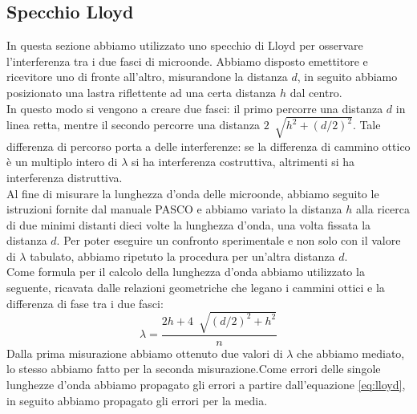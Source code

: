 \documentclass[letterpaper,12pt]{article}
\begin{document}
\subsection{Specchio Lloyd}
In questa sezione abbiamo utilizzato uno specchio di Lloyd per osservare l'interferenza tra i due fasci di microonde. 
Abbiamo disposto emettitore e ricevitore uno di fronte all'altro, misurandone la distanza $d$, in seguito abbiamo 
posizionato una lastra riflettente ad una certa distanza $h$ dal centro. \\
In questo modo si vengono a creare due fasci: il primo percorre una distanza $d$ in linea retta, mentre il secondo
percorre una distanza $2\ \sqrt[]{h^2 + (d/2)^2}$. Tale differenza di percorso porta a delle interferenze: 
se la differenza di cammino ottico è un multiplo intero di $\lambda$ si ha interferenza costruttiva, 
altrimenti si ha interferenza distruttiva.\\
Al fine di misurare la lunghezza d'onda delle microonde, abbiamo seguito le istruzioni fornite dal manuale 
PASCO e abbiamo variato la distanza $h$ alla ricerca di due minimi distanti dieci volte la lunghezza d'onda,
una volta fissata la distanza $d$. Per poter eseguire un confronto sperimentale e non solo con il valore di $\lambda$
tabulato, abbiamo ripetuto la procedura per un'altra distanza $d$. \\
Come formula per il calcolo della lunghezza d'onda abbiamo utilizzato la seguente, ricavata dalle relazioni geometriche
che legano i cammini ottici e la differenza di fase tra i due fasci:
\begin{equation}
    \lambda = \frac{2h + 4\ \sqrt[]{(d/2)^2 + h^2}}{n}
    \label{eq:lloyd}
\end{equation}
Dalla prima misurazione abbiamo ottenuto due valori di $\lambda$ che abbiamo mediato, lo stesso abbiamo fatto per 
la seconda misurazione.Come errori delle singole lunghezze d'onda abbiamo propagato gli errori a partire dall'equazione
\ref{eq:lloyd}, in seguito abbiamo propagato gli errori per la media. \\
\end{document}
